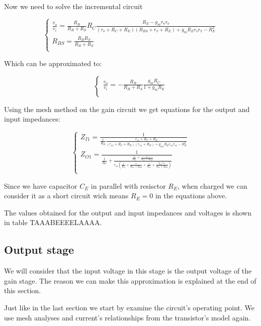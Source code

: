 Now we need to solve the incremental circuit

\begin{equation}\label{eq:v1}
\begin{cases}
\frac{v_o}{v_i}=\frac{R_B}{R_B+R_S} R_C \frac{R_E-g_m r_\pi r_o}{(r_o+R_C+R_E)(R_{BS}+r_\pi+R_E)+g_m R_E r_o r_\pi - R_E^2}\\
R_{BS}=\frac{R_B R_S}{R_B+R_S}\\
\end{cases}
\end{equation}

Which can be approximated to:

\begin{equation}\label{eq:vs1}
\begin{cases}
\frac{v_o}{v_i}=-\frac{R_B}{R_B+R_S} \frac{g_m R_C}{1+g_m R_E}\\
\end{cases}
\end{equation}

 Using the mesh method on the gain circuit we get equations for the output and input impedances:
 
 \begin{equation}\label{eq:Z1}
\begin{cases}
Z_{I1}=\frac{1}{\frac{1}{R_B} \frac{r_{o1}+R_{C}+R_{E}}{(r_{o1}+R_{C}+R_{E})(r_{\pi 1}+R_{E})+g_{m1} R_{E} r_{o1} r_{\pi 1} - R_{E}^2}}\\
Z_{O1}= \frac{1}{\frac{1}{R_C} +\frac{\frac{1}{R_E}+\frac{1}{R_{\pi 1}+R_{BS}}}{r_{o1}(\frac{1}{R_E}+\frac{1}{R_{\pi 1}+R_{BS}}+\frac{1}{R_{o1}}+ \frac{g_{m1} r_{\pi 1}}{R_{\pi 1}+R_{BS}})}}\\
\end{cases}
\end{equation}

 Since we have capacitor $C_E$ in parallel with resisctor $R_E$, when charged we can consider it as a short circuit wich means $R_E=0$ in the equations above.
 \par
The values obtained for the output and input impedances and voltages is shown in table TAAABEEEELAAAA.

\subsection{Output stage}
We will consider that the input voltage in this stage is the output voltage of the gain stage. The reason we can make this approximation is explained at the end of this section.
\par
Just like in the last section we start by examine the circuit's operating point.  We use mesh analyses and current's relationships from the transistor's model again.

